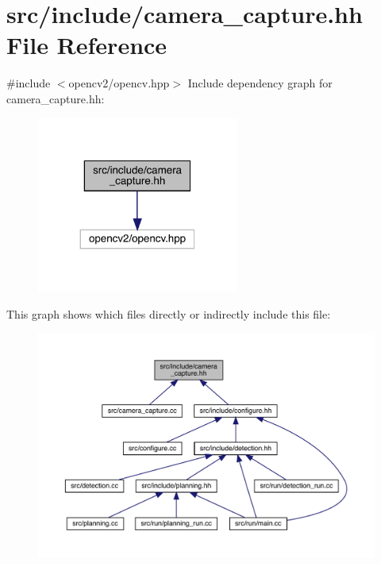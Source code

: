 \hypertarget{camera__capture_8hh}{}\section{src/include/camera\+\_\+capture.hh File Reference}
\label{camera__capture_8hh}
{\ttfamily \#include $<$opencv2/opencv.\+hpp$>$}\newline
Include dependency graph for camera\+\_\+capture.\+hh\+:
\nopagebreak
\begin{figure}[H]
\begin{center}
\leavevmode
\includegraphics[width=188pt]{camera__capture_8hh__incl}
\end{center}
\end{figure}
This graph shows which files directly or indirectly include this file\+:
\nopagebreak
\begin{figure}[H]
\begin{center}
\leavevmode
\includegraphics[width=350pt]{camera__capture_8hh__dep__incl}
\end{center}
\end{figure}
